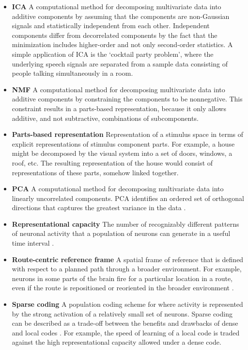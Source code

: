 \begin{itemize}
\item \textbf{\Acf{ICA}} A computational method for decomposing multivariate data into additive components by assuming that the components are non-Gaussian signals and statistically independent from each other. Independent components differ from decorrelated components by the fact that the minimization includes higher-order and not only second-order statistics. A simple application of \ac{ICA} is the `cocktail party problem', where the underlying speech signals are separated from a sample data consisting of people talking simultaneously in a room.

\item \textbf{\Acf{NMF}} A computational method for decomposing multivariate data into additive components by constraining the components to be nonnegative. This constraint results in a parts-based representation, because it only allows additive, and not subtractive, combinations of subcomponents.

\item \textbf{Parts-based representation} Representation of a stimulus space
in terms of explicit representations of stimulus component parts.
For example, a house might be decomposed by the visual system into a set of doors,
windows, a roof, etc. The resulting representation of the house would consist of
representations of these parts, somehow linked together.

\item \textbf{\Acf{PCA}} A computational method for decomposing multivariate data into linearly uncorrelated components. \Ac{PCA} identifies an ordered set of orthogonal directions that captures the greatest variance in the data \cite{CunninghamYu2014}.

\item \textbf{Representational capacity} The number of recognizably different patterns of neuronal activity that a population of neurons can generate in a useful time interval \cite{Laughlin2001}.

\item \textbf{Route-centric reference frame} A spatial frame of reference that is defined with respect to a planned path through a broader environment. For example, neurons in some parts of the brain fire for a particular location in a route, even if the route is repositioned or reoriented in the broader environment \cite{nitz2009parietal}.

\item \textbf{Sparse coding} A population coding scheme for where activity is represented by the strong activation of a relatively small set of neurons. Sparse coding can be described as a trade-off between the benefits and drawbacks of dense and local codes \cite{Foldiak1990}. For example, the speed of learning of a local code is traded against the high representational capacity allowed under a dense code.


\end{itemize}
